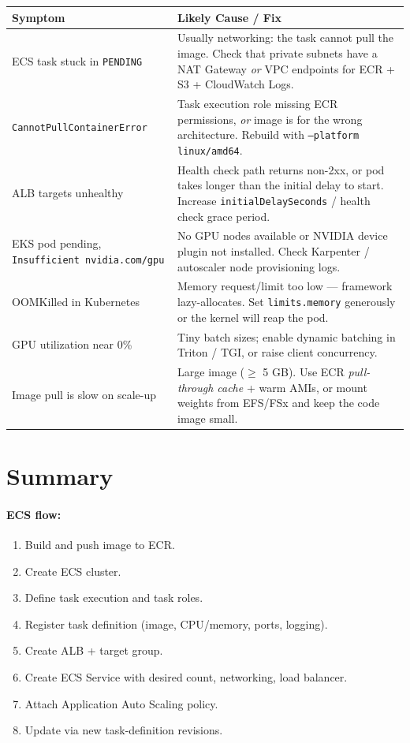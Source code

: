 \documentclass[11pt,a4paper]{article}
\begin{document}
\begin{longtable}{p{5.5cm} p{9.2cm}}
\toprule
\textbf{Symptom} & \textbf{Likely Cause / Fix} \\
\midrule
ECS task stuck in \texttt{PENDING} &
Usually networking: the task cannot pull the image. Check that private
subnets have a NAT Gateway \emph{or} VPC endpoints for ECR + S3 + CloudWatch
Logs. \\
\addlinespace
\texttt{CannotPullContainerError} &
Task execution role missing ECR permissions, \emph{or} image is for the wrong
architecture. Rebuild with \texttt{--platform linux/amd64}. \\
\addlinespace
ALB targets unhealthy &
Health check path returns non-2xx, or pod takes longer than the initial delay
to start. Increase \texttt{initialDelaySeconds} / health check grace period. \\
\addlinespace
EKS pod pending, \texttt{Insufficient nvidia.com/gpu} &
No GPU nodes available or NVIDIA device plugin not installed. Check Karpenter
/ autoscaler node provisioning logs. \\
\addlinespace
OOMKilled in Kubernetes &
Memory request/limit too low --- framework lazy-allocates. Set \texttt{limits.memory}
generously or the kernel will reap the pod. \\
\addlinespace
GPU utilization near 0\% &
Tiny batch sizes; enable dynamic batching in Triton / TGI, or raise client
concurrency. \\
\addlinespace
Image pull is slow on scale-up &
Large image ($\geq$ 5 GB). Use ECR \emph{pull-through cache} + warm AMIs, or
mount weights from EFS/FSx and keep the code image small. \\
\bottomrule
\end{longtable}

\section{Summary}

\paragraph{ECS flow:}
\begin{enumerate}[leftmargin=*,nosep]
    \item Build and push image to ECR.
    \item Create ECS cluster.
    \item Define task execution and task roles.
    \item Register task definition (image, CPU/memory, ports, logging).
    \item Create ALB + target group.
    \item Create ECS Service with desired count, networking, load balancer.
    \item Attach Application Auto Scaling policy.
    \item Update via new task-definition revisions.
\end{enumerate}
\end{document}
